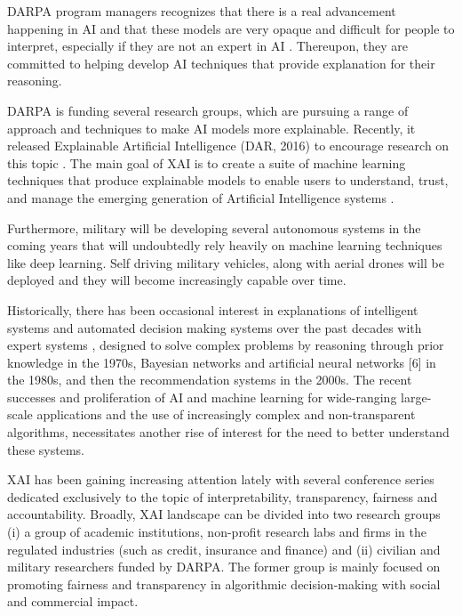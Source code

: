 DARPA program managers recognizes that there is a real advancement happening in AI and that these models are very opaque and difficult for people to interpret, especially if they are not an expert in AI \cite{Knight2017}. Thereupon, they are committed to helping develop AI techniques that provide explanation for their reasoning.

DARPA is funding several research groups, which are pursuing a range of approach and techniques to make AI models more explainable. Recently, it released Explainable Artificial Intelligence (DAR, 2016) to encourage research on this topic \cite{Gunning}. The main goal of XAI is to create a suite of machine learning techniques that produce explainable models to enable users to understand, trust, and manage the emerging generation of Artificial Intelligence systems \cite{Gunning2}.

Furthermore, military will be developing several autonomous systems in the coming years that will undoubtedly rely heavily on machine learning techniques like deep learning. Self driving military vehicles, along with aerial drones will be deployed and they will become increasingly capable over time.

Historically, there has been occasional interest in explanations of intelligent systems and automated decision making systems over the past decades with expert systems \cite{Abdul}, designed to solve complex problems by reasoning through prior knowledge in the 1970s, Bayesian networks and artificial neural networks [6] in the 1980s, and then the recommendation systems in the 2000s. The recent successes and proliferation of AI and machine learning for wide-ranging large-scale applications and the use of increasingly complex and non-transparent algorithms, necessitates another rise of interest for the need to better understand these systems.

XAI has been gaining increasing attention lately with several conference series dedicated exclusively to the topic of interpretability, transparency, fairness and accountability. Broadly, XAI landscape can be divided into two research groups (i) a group of academic institutions, non-profit research labs and firms in the regulated industries (such as credit, insurance and finance) and (ii) civilian and military researchers funded by DARPA. The former group is mainly focused on promoting fairness and transparency in algorithmic decision-making with social and commercial impact.


